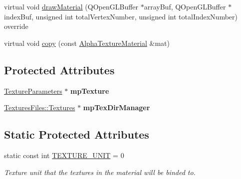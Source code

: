\begin{DoxyCompactItemize}
\item 
virtual void \mbox{\hyperlink{class_geometry_engine_1_1_geometry_material_1_1_alpha_texture_material_a4080f2353ed87dc47589ac5568f48c43}{draw\+Material}} (Q\+Open\+G\+L\+Buffer $\ast$array\+Buf, Q\+Open\+G\+L\+Buffer $\ast$index\+Buf, unsigned int total\+Vertex\+Number, unsigned int total\+Index\+Number) override
\item 
virtual void \mbox{\hyperlink{class_geometry_engine_1_1_geometry_material_1_1_alpha_texture_material_a30869b528be940b9041707570459dcdf}{copy}} (const \mbox{\hyperlink{class_geometry_engine_1_1_geometry_material_1_1_alpha_texture_material}{Alpha\+Texture\+Material}} \&mat)
\end{DoxyCompactItemize}
\subsection*{Protected Attributes}
\begin{DoxyCompactItemize}
\item 
\mbox{\label{class_geometry_engine_1_1_geometry_material_1_1_alpha_texture_material_a4fec444df289a69680c6d5049e2130a6}} 
\mbox{\hyperlink{class_geometry_engine_1_1_geometry_material_1_1_texture_parameters}{Texture\+Parameters}} $\ast$ {\bfseries mp\+Texture}
\item 
\mbox{\label{class_geometry_engine_1_1_geometry_material_1_1_alpha_texture_material_aa82e873085cfff9d3a3dddcda6ce3ca0}} 
\mbox{\hyperlink{class_textures_files_1_1_textures}{Textures\+Files\+::\+Textures}} $\ast$ {\bfseries mp\+Tex\+Dir\+Manager}
\end{DoxyCompactItemize}
\subsection*{Static Protected Attributes}
\begin{DoxyCompactItemize}
\item 
\mbox{\label{class_geometry_engine_1_1_geometry_material_1_1_alpha_texture_material_a8d8ce3552caa204e7d1a33bac2aea100}} 
static const int \mbox{\hyperlink{class_geometry_engine_1_1_geometry_material_1_1_alpha_texture_material_a8d8ce3552caa204e7d1a33bac2aea100}{T\+E\+X\+T\+U\+R\+E\+\_\+\+U\+N\+IT}} = 0
\begin{DoxyCompactList}\small\item\em Texture unit that the textures in the material will be binded to. \end{DoxyCompactList}\end{DoxyCompactItemize}


